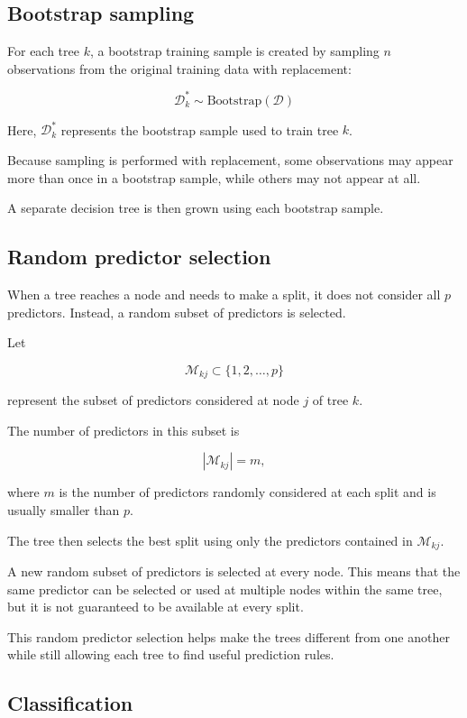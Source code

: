 \documentclass[
  letterpaper,
  DIV=11,
  numbers=noendperiod]{scrreprt}
\begin{document}
\subsection{Bootstrap sampling}\label{bootstrap-sampling}

For each tree \(k\), a bootstrap training sample is created by sampling
\(n\) observations from the original training data with replacement:

\[
\mathcal{D}_k^{*} \sim \text{Bootstrap}(\mathcal{D})
\]

Here, \(\mathcal{D}_k^{*}\) represents the bootstrap sample used to
train tree \(k\).

Because sampling is performed with replacement, some observations may
appear more than once in a bootstrap sample, while others may not appear
at all.

A separate decision tree is then grown using each bootstrap sample.

\subsection{Random predictor
selection}\label{random-predictor-selection}

When a tree reaches a node and needs to make a split, it does not
consider all \(p\) predictors. Instead, a random subset of predictors is
selected.

Let

\[
\mathcal{M}_{kj} \subset \{1,2,\ldots,p\}
\]

represent the subset of predictors considered at node \(j\) of tree
\(k\).

The number of predictors in this subset is

\[
|\mathcal{M}_{kj}| = m,
\]

where \(m\) is the number of predictors randomly considered at each
split and is usually smaller than \(p\).

The tree then selects the best split using only the predictors contained
in \(\mathcal{M}_{kj}\).

A new random subset of predictors is selected at every node. This means
that the same predictor can be selected or used at multiple nodes within
the same tree, but it is not guaranteed to be available at every split.

This random predictor selection helps make the trees different from one
another while still allowing each tree to find useful prediction rules.

\subsection{Classification}\label{classification}
\end{document}
